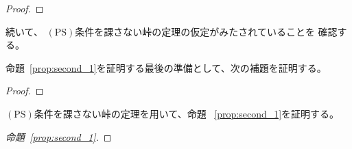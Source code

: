 \begin{proof}
 
\end{proof}

続いて、
$(\mathrm{PS})$条件を課さない峠の定理の仮定がみたされていることを
確認する。

\begin{lem}
 
\end{lem}

命題~\ref{prop:second_1}を証明する最後の準備として、次の補題を証明する。

\begin{lem} \label{lem:mountain_dec}
 
\end{lem}

\begin{proof}
 
\end{proof}

$(\mathrm{PS})$条件を課さない峠の定理を用いて、命題
~\ref{prop:second_1}を証明する。

\begin{proof}[命題~\ref{prop:second_1}]
 
\end{proof}

